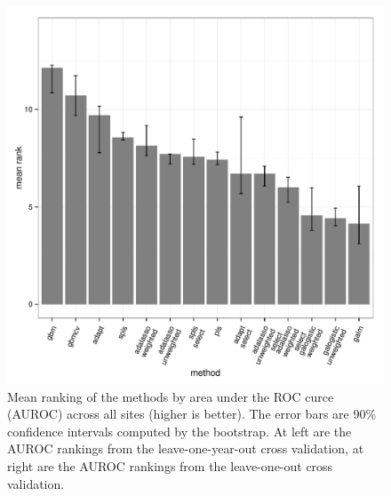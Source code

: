 \documentclass{article}\usepackage[]{graphicx}\usepackage[]{color}
\makeatletter
\newenvironment{kframe}{%
 \def\at@end@of@kframe{}%
 \ifinner\ifhmode%
  \def\at@end@of@kframe{\end{minipage}}%
  \begin{minipage}{\columnwidth}%
 \fi\fi%
 \def\FrameCommand##1{\hskip\@totalleftmargin \hskip-\fboxsep
 \colorbox{shadecolor}{##1}\hskip-\fboxsep
     \hskip-\linewidth \hskip-\@totalleftmargin \hskip\columnwidth}%
 \MakeFramed {\advance\hsize-\width
   \@totalleftmargin\z@ \linewidth\hsize
   \@setminipage}}%
 {\par\unskip\endMakeFramed%
 \at@end@of@kframe}
\newenvironment{knitrout}{}{} %
\numberwithin{equation}{section}
\numberwithin{figure}{section}
\renewcommand\[{\begin{equation}}
\renewcommand\]{\end{equation}}
\makeatother
\begin{document}
\begin{knitrout}
\color{fgcolor}\begin{kframe}


{\ttfamily\noindent\bfseries\color{errorcolor}{\#\# Error: error in evaluating the argument 'x' in selecting a method for function 'print': Error: object 'roc.barchart' not found}}\end{kframe}\begin{figure}[]

\includegraphics[width=0.49\linewidth]{figure/auroc-boxplot} \caption[Mean ranking of the methods by area under the ROC curce (AUROC) across all sites (higher is better)]{Mean ranking of the methods by area under the ROC curce (AUROC) across all sites (higher is better). The error bars are 90\% confidence intervals computed by the bootstrap. At left are the AUROC rankings from the leave-one-year-out cross validation, at right are the AUROC rankings from the leave-one-out cross validation.\label{fig:auroc-boxplot}}
\end{figure}


\end{knitrout}
\end{document}
